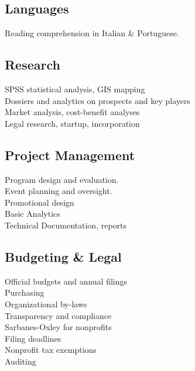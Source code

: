\documentclass[]{deedy-resume-openfont}
\begin{document}
\hfill
\begin{minipage}[t]{.45\textwidth}
    \subsection{Languages}
        \textbullet{} 
		\textbullet{} Reading comprehension in Italian \& Portuguese.\\
    \sectionsep
	\subsection{Research}
    	\textbullet{} SPSS statistical analysis, GIS mapping \\
    	\textbullet{} Dossiers and analytics on prospects and key players \\
        \textbullet{} Market analysis, cost-benefit analyses \\
        \textbullet{} Legal research, startup, incorporation\\
    \sectionsep
     \subsection{Project Management}
        \textbullet{} Program design and evaluation.\\
		\textbullet{} Event planning and oversight.\\
        \textbullet{} Promotional design\\
        \textbullet{} Basic Analytics \\
        \textbullet{} Technical Documentation, reports\\
    \sectionsep
    \subsection{Budgeting \& Legal}
        \textbullet{} Official budgets and annual filings\\
        \textbullet{} Purchasing\\
		\textbullet{} Organizational by-laws\\
        \textbullet{} Transparency and compliance\\
        \textbullet{} Sarbanes-Oxley for nonprofits\\
		\textbullet{} Filing deadlines\\
        \textbullet{} Nonprofit tax exemptions\\
  	    \textbullet{} Auditing
    \sectionsep
\end{minipage}
\sectionsep
\sectionsep

\fi
\end{document}
